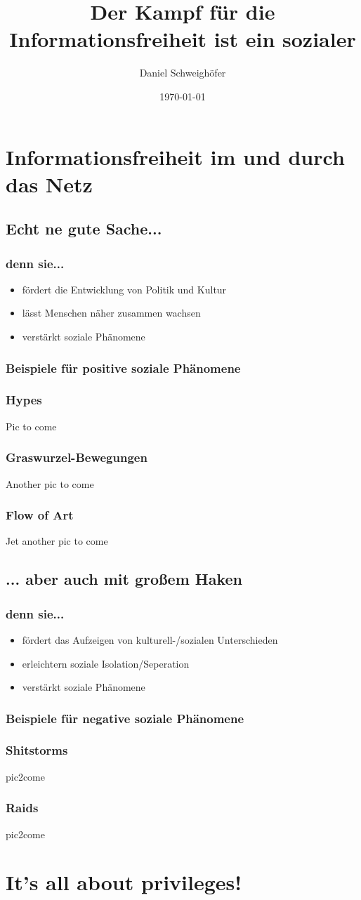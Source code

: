 \documentclass{beamer}
\title{Der Kampf für die Informationsfreiheit ist ein sozialer}
\author{Daniel Schweighöfer}
\date{\today}
\begin{document}
\frame{\titlepage}

\section[Einführung]{}
\frame{\tableofcontents}

\section{Informationsfreiheit im und durch das Netz}
\subsection{Echt ne gute Sache...}
\frame
{
  \frametitle{denn sie...}

  \begin{itemize}[<+->]
  \item fördert die Entwicklung von Politik und Kultur
  \item lässt Menschen näher zusammen wachsen
  \item verstärkt soziale Phänomene
  \end{itemize}
}
\subsubsection{Beispiele für positive soziale Phänomene}
\frame
{
  \frametitle{Hypes}
    Pic to come
}
\frame
{
  \frametitle{Graswurzel-Bewegungen}
    Another pic to come
}
\frame
{
  \frametitle{Flow of Art}
    Jet another pic to come
}
\subsection{... aber auch mit großem Haken}
\frame
{
  \frametitle{denn sie...}

  \begin{itemize}[<+->]
  \item fördert das Aufzeigen von kulturell-/sozialen Unterschieden
  \item erleichtern soziale Isolation/Seperation
  \item verstärkt soziale Phänomene
  \end{itemize}
}
\subsubsection{Beispiele für negative soziale Phänomene}
\frame
{
  \frametitle{Shitstorms}
  pic2come
}
\frame
{
  \frametitle{Raids}
  pic2come
}
\section{It's all about privileges!}
\end{document}
